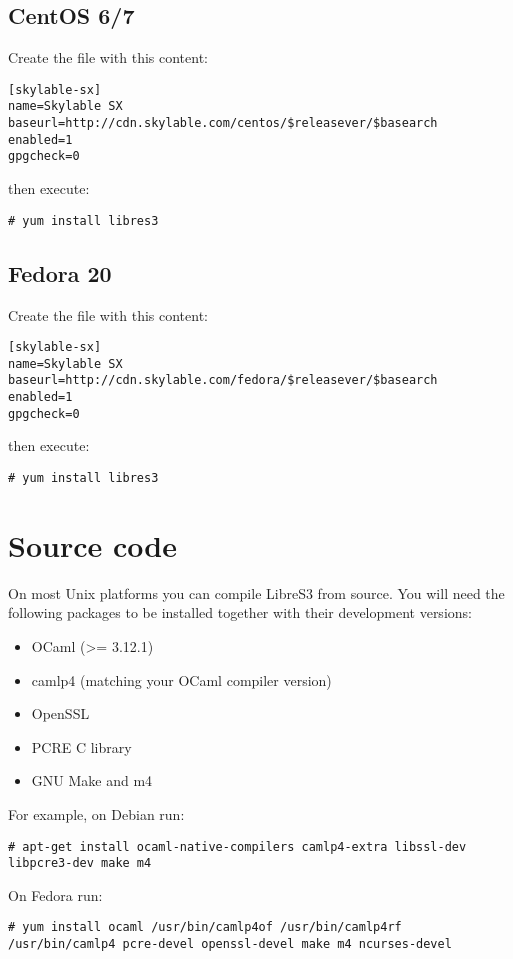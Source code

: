 \subsection{CentOS 6/7}
Create the file  with this content:
\begin{lstlisting}
[skylable-sx]
name=Skylable SX
baseurl=http://cdn.skylable.com/centos/$releasever/$basearch
enabled=1
gpgcheck=0
\end{lstlisting}
then execute:
\begin{lstlisting}
# yum install libres3
\end{lstlisting}

\subsection{Fedora 20}
Create the file  with this content:
\begin{lstlisting}
[skylable-sx]
name=Skylable SX
baseurl=http://cdn.skylable.com/fedora/$releasever/$basearch
enabled=1
gpgcheck=0
\end{lstlisting}
then execute:
\begin{lstlisting}
# yum install libres3
\end{lstlisting}

\section{Source code}

On most Unix platforms you can compile LibreS3
from source. You will need the following packages to be installed together with their
development versions:
\begin{itemize}
    \item OCaml (>= 3.12.1)
    \item camlp4 (matching your OCaml compiler version)
    \item OpenSSL
    \item PCRE C library
    \item GNU Make and m4
\end{itemize}
For example, on Debian run:

\begin{lstlisting}
# apt-get install ocaml-native-compilers camlp4-extra libssl-dev libpcre3-dev make m4
\end{lstlisting}

On Fedora run:

\begin{lstlisting}
# yum install ocaml /usr/bin/camlp4of /usr/bin/camlp4rf /usr/bin/camlp4 pcre-devel openssl-devel make m4 ncurses-devel
\end{lstlisting}


